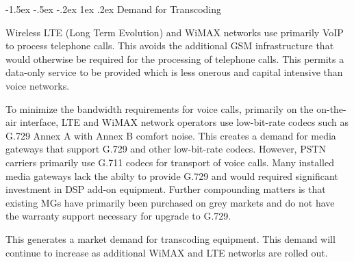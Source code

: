 \documentclass[letterpaper,final,notitlepage,twocolumn,10pt,twoside]{article}
\makeatletter
\let\normalsize = \small
\let\small = \footnotesize
\let\footnotesize = \scriptsize
\let\scriptsize = \tiny
\renewcommand\subsection{\@startsection{subsection}{2}{\z@}%
                                     {-1.5ex \@plus -.5ex \@minus -.2ex}%
                                     {1ex \@plus .2ex}%
                                     {\normalfont\normalsize\bfseries}}
\makeatother
\begin{document}
\subsection{Demand for Transcoding}

Wireless LTE (Long Term Evolution) and WiMAX networks use primarily VoIP to
process telephone calls.  This avoids the additional GSM infrastructure that
would otherwise be required for the processing of telephone calls.  This permits
a data-only service to be provided which is less onerous and capital intensive
than voice networks.

To minimize the bandwidth requirements for voice calls, primarily on the
on-the-air interface, LTE and WiMAX network operators use low-bit-rate codecs
such as G.729 Annex A with Annex B comfort noise.  This creates a demand for
media gateways that support G.729 and other low-bit-rate codecs.  However, PSTN
carriers primarily use G.711 codecs for transport of voice calls.  Many
installed media gateways lack the abilty to provide G.729 and would required
significant investment in DSP add-on equipment.  Further compounding matters is
that existing MGs have primarily been purchased on grey markets and do not have
the warranty support necessary for upgrade to G.729.

This generates a market demand for transcoding equipment.  This demand will
continue to increase as additional WiMAX and LTE networks are rolled out.

%
%

%
\end{document}
